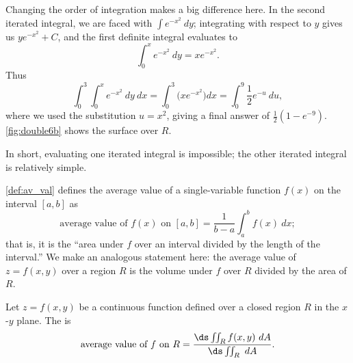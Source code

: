 \begin{example}
Changing the order of integration makes a big difference here. In the second iterated integral, we are faced with $\int e^{-x^2}\ dy$; integrating with respect to $y$ gives us $ye^{-x^2}+C$, and the first definite integral evaluates to 
\[\int_0^x e^{-x^2}\ dy = xe^{-x^2}.\]
%
%
%
Thus 
\[
 \int_0^3\int_0^x e^{-x^2}\ dy\ dx
 = \int_0^3\Big(xe^{-x^2}\Big)dx
 = \int_0^9\frac12 e^{-u}\ du,
\]
where we used the substitution $u=x^2$, giving a final answer of $\frac12(1-e^{-9})%
$. \autoref{fig:double6b} shows the surface over $R$.

In short, evaluating one iterated integral is impossible; the other iterated integral is relatively simple.
\end{example}

\autoref{def:av_val} defines the average value of a single-variable function $f(x)$ on the interval $[a,b]$ as
\[\text{average value of $f(x)$ on $[a,b]$} = \frac1{b-a}\int_a^b f(x)\ dx;\]
that is, it is the ``area under $f$ over an interval divided by the length of the interval.'' We make an analogous statement here: the average value of $z=f(x,y)$ over a region $R$ is the volume under $f$ over $R$ divided by the area of $R$.

\begin{definition}\label{def:av_val2}
Let $z=f(x,y)$ be a continuous function defined over a closed region $R$ in the $x$-$y$ plane. The  is 
\[\text{average value of $f$ on $R$} = \frac{\ds \iint_R f(x,y)\ dA}{\ds\iint_R \ dA}.\]
\end{definition}

